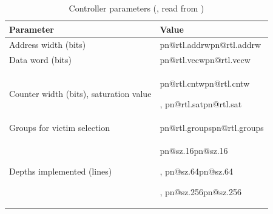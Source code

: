 \documentclass[11pt,a4paper]{article}
\makeatletter
\DeclareRobustCommand{\R}[1]{\ifcsname pn@#1\endcsname\csname pn@#1\endcsname\else
  \PackageError{synthesis report}{number key '#1' is not defined in macros.tex}{Run tools/make_paper_macros.py --target synth}\fi}
\makeatother
\begin{document}
\begin{table}[ht]
\centering
\caption{Controller parameters (\protect{}, read from \protect{})}
\label{tab:params}
\begin{tabular}{@{}ll@{}}
\toprule
Parameter & Value \\
\midrule
Address width (bits) & \R{rtl.addrw} \\
Data word (bits) & \R{rtl.vecw} \\
Counter width (bits), saturation value & \R{rtl.cntw}, \R{rtl.sat} \\
Groups for victim selection & \R{rtl.groups} \\
Depths implemented (lines) & \R{sz.16}, \R{sz.64}, \R{sz.256} \\
\bottomrule
\end{tabular}
\end{table}
\end{document}
